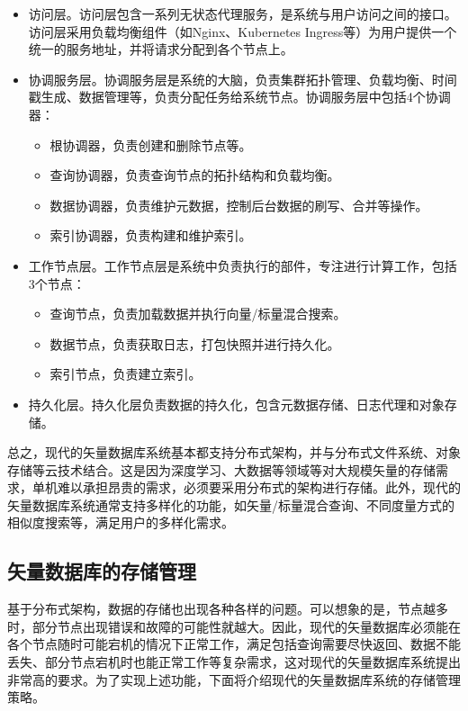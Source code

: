 \begin{itemize}
    \item 访问层。访问层包含一系列无状态代理服务，是系统与用户访问之间的接口。访问层采用负载均衡组件（如Nginx、Kubernetes Ingress等）为用户提供一个统一的服务地址，并将请求分配到各个节点上。
    \item 协调服务层。协调服务层是系统的大脑，负责集群拓扑管理、负载均衡、时间戳生成、数据管理等，负责分配任务给系统节点。协调服务层中包括4个协调器：
    \begin{itemize}
        \item 根协调器，负责创建和删除节点等。
        \item 查询协调器，负责查询节点的拓扑结构和负载均衡。
        \item 数据协调器，负责维护元数据，控制后台数据的刷写、合并等操作。
        \item 索引协调器，负责构建和维护索引。
    \end{itemize}
    \item 工作节点层。工作节点层是系统中负责执行的部件，专注进行计算工作，包括3个节点：
    \begin{itemize}
        \item 查询节点，负责加载数据并执行向量/标量混合搜索。
        \item 数据节点，负责获取日志，打包快照并进行持久化。
        \item 索引节点，负责建立索引。
    \end{itemize}
    \item 持久化层。持久化层负责数据的持久化，包含元数据存储、日志代理和对象存储。
\end{itemize}

总之，现代的矢量数据库系统基本都支持分布式架构，并与分布式文件系统、对象存储等云技术结合。这是因为深度学习、大数据等领域等对大规模矢量的存储需求，单机难以承担昂贵的需求，必须要采用分布式的架构进行存储。此外，现代的矢量数据库系统通常支持多样化的功能，如矢量/标量混合查询、不同度量方式的相似度搜索等，满足用户的多样化需求。

\subsection{矢量数据库的存储管理}

基于分布式架构，数据的存储也出现各种各样的问题。可以想象的是，节点越多时，部分节点出现错误和故障的可能性就越大。因此，现代的矢量数据库必须能在各个节点随时可能宕机的情况下正常工作，满足包括查询需要尽快返回、数据不能丢失、部分节点宕机时也能正常工作等复杂需求，这对现代的矢量数据库系统提出非常高的要求。为了实现上述功能，下面将介绍现代的矢量数据库系统的存储管理策略。

